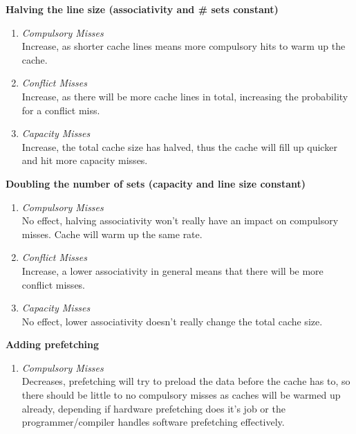 \documentclass[11pt]{article}
\begin{document}
\begin{Parts}
	\Part \textbf{Halving the line size (associativity and \# sets constant)} \\ 
		\begin{enumerate}[i]
			\item \textit{Compulsory Misses} \\
				Increase, as shorter cache lines means more compulsory hits to warm up the cache.
			\item \textit{Conflict Misses} \\
				Increase, as there will be more cache lines in total, increasing the probability for a conflict miss. 
			\item \textit{Capacity Misses} \\
				Increase, the total cache size has halved, thus the cache will fill up quicker and hit more capacity misses.
		\end{enumerate}
	\Part \textbf{Doubling the number of sets (capacity and line size constant)} \\ 
		\begin{enumerate}[i]
			\item \textit{Compulsory Misses} \\
				No effect, halving associativity won't really have an impact on compulsory misses. Cache will warm up the same rate.
			\item \textit{Conflict Misses} \\
				Increase, a lower associativity in general means that there will be more conflict misses.
			\item \textit{Capacity Misses} \\
				No effect, lower associativity doesn't really change the total cache size.
		\end{enumerate}
	\Part \textbf{Adding prefetching} \\ 
		\begin{enumerate}[i]
			\item \textit{Compulsory Misses} \\
				Decreases, prefetching will try to preload the data before the cache has to, so there should be little to no compulsory misses as caches will be warmed up already, depending if hardware prefetching does it's job or the programmer/compiler handles software prefetching effectively.

\end{enumerate}
\end{Parts}
\end{document}
